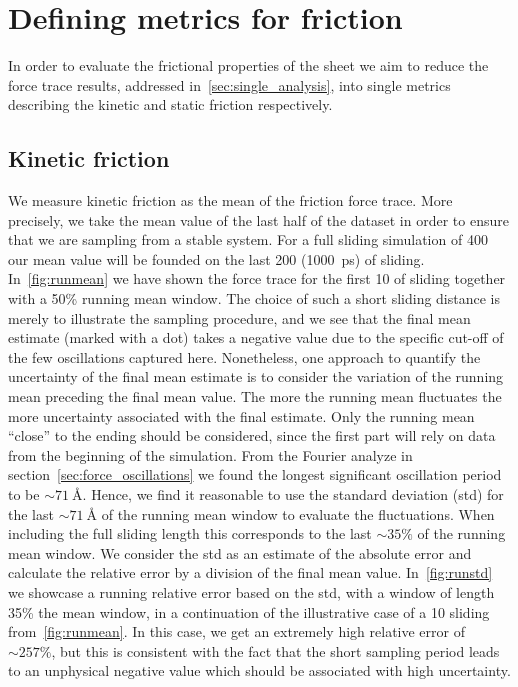 \section{Defining metrics for friction}\label{sec:fric_metrics}
In order to evaluate the frictional properties of the sheet we aim to reduce the force trace results, addressed in~\cref{sec:single_analysis}, into single metrics describing the kinetic and static friction respectively. 

\subsection{Kinetic friction}
We measure kinetic friction as the mean of the friction force trace. More
precisely, we take the mean value of the last half of the dataset in order to
ensure that we are sampling from a stable system. For a full sliding simulation
of \SI{400}{} our mean value will be founded on the last \SI{200}{}
(\SI{1000}{ps}) of sliding. In~\cref{fig:runmean} we have shown the force trace
for the first \SI{10}{} of sliding together with a 50\% running mean window.
The choice of such a short sliding distance is merely to illustrate the sampling
procedure, and we see that the final mean estimate (marked with a dot) takes a
negative value due to the specific cut-off of the few oscillations captured
here. Nonetheless, one approach to quantify the uncertainty of the final mean
estimate is to consider the variation of the running mean preceding the final
mean value. The more the running mean fluctuates the more uncertainty associated
with the final estimate. Only the running mean ``close'' to the ending should be
considered, since the first part will rely on data from the beginning of the
simulation. From the Fourier analyze in section~\cref{sec:force_oscillations} we
found the longest significant oscillation period to be $\sim \SI{71}{\text{Å}}$.
Hence, we find it reasonable to use the standard deviation (\acrshort{std}) for
the last $\sim \SI{71}{\text{Å}}$ of the running mean window to evaluate the
fluctuations. When including the full sliding length this corresponds to the
last $\sim 35 \%$ of the running mean window. We consider the \acrshort{std} as
an estimate of the absolute error and calculate the relative error by a division
of the final mean value. In~\cref{fig:runstd} we showcase a running relative
error based on the \acrshort{std}, with a window of length 35\% the mean window,
in a continuation of the illustrative case of a \SI{10}{} sliding
from~\cref{fig:runmean}. In this case, we get an extremely high relative error of
$\sim 257\%$, but this is consistent with the fact that the short sampling period leads to an unphysical negative value which should be associated with high uncertainty. 

